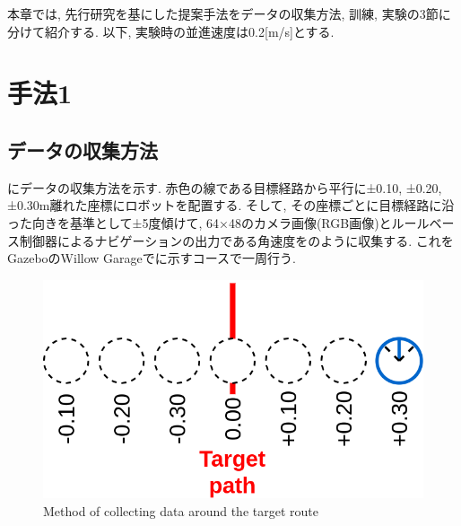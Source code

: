 
本章では, 先行研究を基にした提案手法をデータの収集方法, 訓練, 実験の3節に分けて紹介する. 以下, 実験時の並進速度は0.2[m/s]とする. 

\section{手法1}

\subsection{データの収集方法}
にデータの収集方法を示す. 赤色の線である目標経路から平行に±0.10, ±0.20, ±0.30m離れた座標にロボットを配置する. そして, その座標ごとに目標経路に沿った向きを基準として±5度傾けて, 64×48のカメラ画像(RGB画像)とルールベース制御器によるナビゲーションの出力である角速度をのように収集する. これをGazebo\cite{gazebo}のWillow Garage\cite{willow}でに示すコースで一周行う.


\begin{figure}[h]
  \centering
  \includegraphics[keepaspectratio, scale=0.25]{images/old-method.png}
  \caption{Method of collecting data around the target route}
  \label{Fig:old-method}
  \end{figure}

